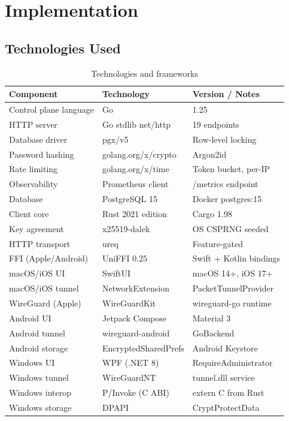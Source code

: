 \documentclass[12pt,a4paper]{report}
\begin{document}
\chapter{Implementation}

\section{Technologies Used}

\begin{table}[H]
\centering\small
\caption{Technologies and frameworks}
\label{tab:tech}
\begin{tabular}{lll}
\toprule
\textbf{Component} & \textbf{Technology} & \textbf{Version / Notes}\\
\midrule
Control plane language  & Go                    & 1.25\\
HTTP server             & Go stdlib net/http    & 19 endpoints\\
Database driver         & pgx/v5                & Row-level locking\\
Password hashing        & golang.org/x/crypto   & Argon2id\\
Rate limiting           & golang.org/x/time     & Token bucket, per-IP\\
Observability           & Prometheus client     & /metrics endpoint\\
Database                & PostgreSQL 15         & Docker postgres:15\\
Client core             & Rust 2021 edition     & Cargo 1.98\\
Key agreement           & x25519-dalek          & OS CSPRNG seeded\\
HTTP transport          & ureq                  & Feature-gated\\
FFI (Apple/Android)     & UniFFI 0.25           & Swift + Kotlin bindings\\
macOS/iOS UI            & SwiftUI               & macOS 14+, iOS 17+\\
macOS/iOS tunnel        & NetworkExtension      & PacketTunnelProvider\\
WireGuard (Apple)       & WireGuardKit          & wireguard-go runtime\\
Android UI              & Jetpack Compose       & Material 3\\
Android tunnel          & wireguard-android     & GoBackend\\
Android storage         & EncryptedSharedPrefs  & Android Keystore\\
Windows UI              & WPF (.NET 8)          & RequireAdministrator\\
Windows tunnel          & WireGuardNT           & tunnel.dll service\\
Windows interop         & P/Invoke (C ABI)      & extern C from Rust\\
Windows storage         & DPAPI                 & CryptProtectData\\
\bottomrule
\end{tabular}
\end{table}
\end{document}
